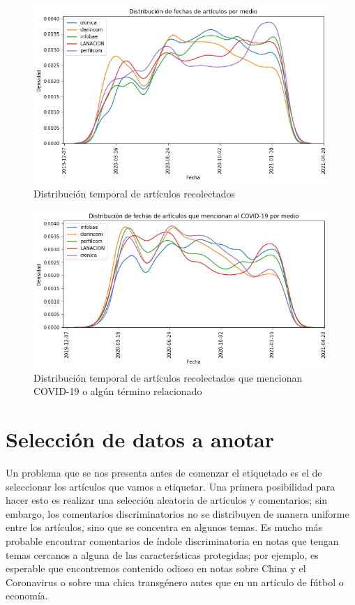 \begin{figure}
    \centering
    \includegraphics[width=\textwidth]{img/fechas_por_medios_todas.png}
    \caption{Distribución temporal de artículos recolectados}
    \label{fig:fecha_articulos_por_medio_todas}
\end{figure}



\begin{figure}
    \centering
    \includegraphics[width=\textwidth]{img/fechas_por_medios.png}
    \caption{Distribución temporal de artículos recolectados que mencionan COVID-19 o algún término relacionado}
    \label{fig:fecha_articulos_por_medio_covid}
\end{figure}



\section{Selección de datos a anotar}


Un problema que se nos presenta antes de comenzar el etiquetado es el de seleccionar los artículos que vamos a etiquetar. Una primera posibilidad para hacer esto es realizar una selección aleatoria de artículos y comentarios; sin embargo, los comentarios discriminatorios no se distribuyen de manera uniforme entre los artículos, sino que se concentra en algunos temas. Es mucho más probable encontrar comentarios de índole discriminatoria en notas que tengan temas cercanos a alguna de las características protegidas; por ejemplo, es esperable que encontremos contenido odioso en notas sobre China y el Coronavirus o sobre una chica transgénero antes que en un artículo de fútbol o economía.

